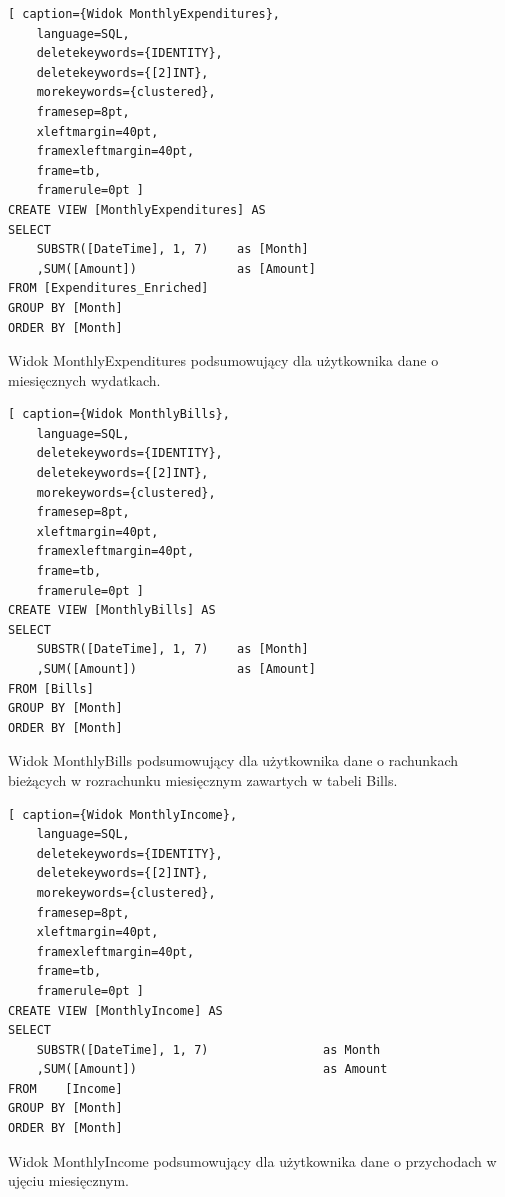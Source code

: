 \documentclass[a4paper,10pt]{report}
\begin{document}
\begin{minipage}{\textwidth}
\begin{lstlisting}[ caption={Widok MonthlyExpenditures},
    language=SQL,
    deletekeywords={IDENTITY},
    deletekeywords={[2]INT},
    morekeywords={clustered},
    framesep=8pt,
    xleftmargin=40pt,
    framexleftmargin=40pt,
    frame=tb,
    framerule=0pt ]
CREATE VIEW [MonthlyExpenditures] AS
SELECT 
    SUBSTR([DateTime], 1, 7)    as [Month]
    ,SUM([Amount])              as [Amount]
FROM [Expenditures_Enriched]
GROUP BY [Month]
ORDER BY [Month]
\end{lstlisting}
{Widok MonthlyExpenditures podsumowujący dla użytkownika dane o miesięcznych 
wydatkach.}
\end{minipage}

\begin{minipage}{\textwidth}
\begin{lstlisting}[ caption={Widok MonthlyBills},
    language=SQL,
    deletekeywords={IDENTITY},
    deletekeywords={[2]INT},
    morekeywords={clustered},
    framesep=8pt,
    xleftmargin=40pt,
    framexleftmargin=40pt,
    frame=tb,
    framerule=0pt ]
CREATE VIEW [MonthlyBills] AS
SELECT 
    SUBSTR([DateTime], 1, 7)    as [Month]
    ,SUM([Amount])              as [Amount]
FROM [Bills]
GROUP BY [Month]
ORDER BY [Month]
\end{lstlisting}
{Widok MonthlyBills podsumowujący dla użytkownika dane o rachunkach bieżących 
w rozrachunku miesięcznym zawartych w tabeli Bills.}
\end{minipage}

\begin{minipage}{\textwidth}
\begin{lstlisting}[ caption={Widok MonthlyIncome},
    language=SQL,
    deletekeywords={IDENTITY},
    deletekeywords={[2]INT},
    morekeywords={clustered},
    framesep=8pt,
    xleftmargin=40pt,
    framexleftmargin=40pt,
    frame=tb,
    framerule=0pt ]
CREATE VIEW [MonthlyIncome] AS
SELECT
	SUBSTR([DateTime], 1, 7)				as Month
	,SUM([Amount])							as Amount
FROM 	[Income]
GROUP BY [Month]
ORDER BY [Month]
\end{lstlisting}
{Widok MonthlyIncome podsumowujący dla użytkownika dane o przychodach w ujęciu 
miesięcznym.}
\end{minipage}
\end{document}
